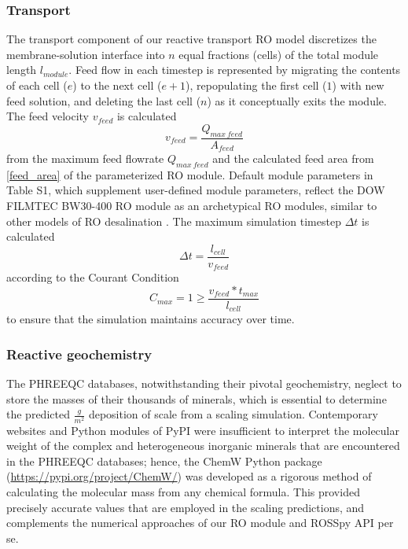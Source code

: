 \subsubsection{Transport}
The transport component of our reactive transport RO model discretizes the membrane-solution interface into $n$ equal fractions (cells) of the total module length $l_{module}$. Feed flow in each timestep is represented by migrating the contents of each cell ($e$) to the next cell ($e+1$), repopulating the first cell ($1$) with new feed solution, and deleting the last cell ($n$) as it conceptually exits the module. The feed velocity $v_{feed}$ is calculated
\begin{equation} \label{feed_velocity}
    v_{feed}=\frac{Q_{max~feed}}{A_{feed}}
\end{equation}
from the maximum feed flowrate $Q_{max~feed}$ and the calculated feed area from \cref{feed_area} of the parameterized RO module. Default module parameters in Table S1, which supplement user-defined module parameters, reflect the DOW FILMTEC BW30-400 RO module as an archetypical RO modules, similar to other models of RO desalination \cite{Li2012OptimalDesalination}. The maximum simulation timestep $\Delta t$ is calculated
\begin{equation} \label{timestep}
    \Delta t=\frac{l_{cell}}{v_{feed}}
\end{equation}
according to the Courant Condition \cite{Gnedin2018EnforcingSchemes} 
\begin{equation} \label{courant_condition}
    C_{max}=1 \ge \frac{v_{feed}*t_{max}}{l_{cell}}
\end{equation}
to ensure that the simulation maintains accuracy over time.


\subsubsection{Reactive geochemistry}
The PHREEQC databases, notwithstanding their pivotal geochemistry, neglect to store the masses of their thousands of minerals, which is essential to determine the predicted $\frac{g}{m^2}$ deposition of scale from a scaling simulation. Contemporary websites and Python modules of PyPI were insufficient to interpret the molecular weight of the complex and heterogeneous inorganic minerals that are encountered in the PHREEQC databases; hence, the ChemW Python package (\url{https://pypi.org/project/ChemW/}) was developed as a rigorous method of calculating the molecular mass from any chemical formula. This provided precisely accurate values that are employed in the scaling predictions, and complements the numerical approaches of our RO module and ROSSpy API per se. 

